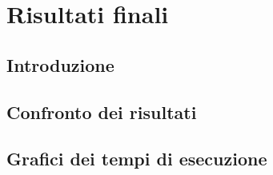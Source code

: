 \chapter{Risultati finali}
\label{cap:risultati}
\section{Introduzione}
\section{Confronto dei risultati}
\section{Grafici dei tempi di esecuzione}